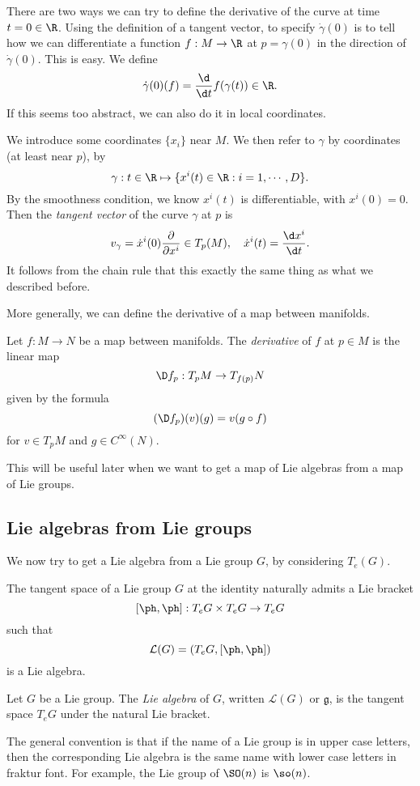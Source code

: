 \documentclass[a4paper]{article}
\begin{document}
There are two ways we can try to define the derivative of the curve at time $t = 0 \in \R$. Using the definition of a tangent vector, to specify $\dot{\gamma}(0)$ is to tell how we can differentiate a function $f: M \to \R$ at $p = \gamma(0)$ in the direction of $\dot{\gamma}(0)$. This is easy. We define
\[
  \dot{\gamma}(0)(f) = \frac{\d}{\d t} f(\gamma(t)) \in \R.
\]
If this seems too abstract, we can also do it in local coordinates.

We introduce some coordinates $\{x_i\}$ near $M$. We then refer to $\gamma$ by coordinates (at least near $p$), by
\[
  \gamma: t \in \R \mapsto \{x^i(t) \in \R: i = 1, \cdots, D\}.
\]
By the smoothness condition, we know $x^i(t)$ is differentiable, with $x^i(0) = 0$. Then the \emph{tangent vector} of the curve $\gamma$ at $p$ is
\[
  v_\gamma = \dot{x}^i(0) \frac{\partial}{\partial x^i} \in T_p (M),\quad \dot{x}^i(t) = \frac{\d x^i}{\d t}.
\]
It follows from the chain rule that this exactly the same thing as what we described before.

More generally, we can define the derivative of a map between manifolds.
\begin{defi}[Derivative]
  Let $f: M \to N$ be a map between manifolds. The \emph{derivative} of $f$ at $p \in M$ is the linear map
  \[
    \D f_p: T_p M \to T_{f(p)} N
  \]
  given by the formula
  \[
    (\D f_p)(v)(g) = v(g \circ f)
  \]
  for $v \in T_p M$ and $g \in C^\infty(N)$.
\end{defi}
This will be useful later when we want to get a map of Lie algebras from a map of Lie groups.

\subsection{Lie algebras from Lie groups}
We now try to get a Lie algebra from a Lie group $G$, by considering $T_e(G)$.

\begin{thm}
  The tangent space of a Lie group $G$ at the identity naturally admits a Lie bracket
  \[
    [\ph, \ph]: T_e G \times T_e G \to T_e G
  \]
  such that
  \[
    \mathcal{L}(G) = (T_e G, [\ph, \ph])
  \]
  is a Lie algebra.
\end{thm}

\begin{defi}
  Let $G$ be a Lie group. The \emph{Lie algebra} of $G$, written $\mathcal{L}(G)$ or $\mathfrak{g}$, is the tangent space $T_e G$ under the natural Lie bracket.
\end{defi}
The general convention is that if the name of a Lie group is in upper case letters, then the corresponding Lie algebra is the same name with lower case letters in fraktur font. For example, the Lie group of $\SO(n)$ is $\so(n)$.
\end{document}
